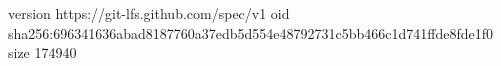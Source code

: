 version https://git-lfs.github.com/spec/v1
oid sha256:696341636abad8187760a37edb5d554e48792731c5bb466c1d741ffde8fde1f0
size 174940
